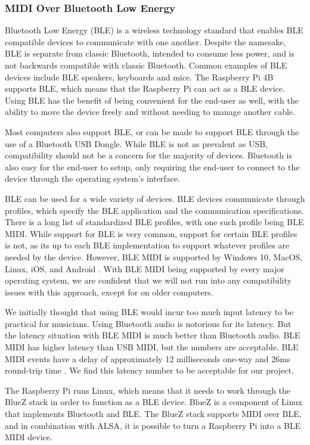 \subsubsection{MIDI Over Bluetooth Low Energy}
\label{sec:ble_midi}

Bluetooth Low Energy (BLE) is a wireless technology standard that enables BLE compatible
devices to communicate with one another. Despite the namesake, BLE is separate from
classic Bluetooth, intended to consume less power, and is not backwards compatible with
classic Bluetooth. Common examples of BLE devices include BLE speakers, keyboards and
mice. The Raspberry Pi 4B supports BLE, which means that the Raspberry Pi can act as a BLE
device. Using BLE has the benefit of being convenient for the end-user as well, with the
ability to move the device freely and without needing to manage another cable.

Most computers also support BLE, or can be made to support BLE through the use of a
Bluetooth USB Dongle. While BLE is not as prevalent as USB, compatibility should not be a
concern for the majority of devices. Bluetooth is also easy for the end-user to setup,
only requiring the end-user to connect to the device through the operating system's
interface.

BLE can be used for a wide variety of devices. BLE devices communicate through profiles,
which specify the BLE  application and the communication specifications. There is a long
list of standardized BLE profiles, with one such profile being BLE MIDI. While support for
BLE is very common, support for certain BLE profiles is not, as its up to each BLE
implementation to support whatever profiles are needed by the device. However, BLE MIDI is
supported by Windows 10, MacOS, Linux, iOS, and Android \autocite{ble-latency}. With BLE
MIDI being supported by every major operating system, we are confident that we will not
run into any compatibility issues with this approach, except for on older computers.

We initially thought that using BLE would incur too much input latency to be practical for
musicians. Using Bluetooth audio is notorious for its latency. But the latency situation
with BLE MIDI is much better than Bluetooth audio. BLE MIDI has higher latency than USB
MIDI, but the numbers are acceptable. BLE MIDI events have a delay of approximately 12
milliseconds one-way and 26ms round-trip time \autocite{ble-latency}. We find this
latency number to be acceptable for our project.

The Raspberry Pi runs Linux, which means that it needs to work through the BlueZ stack in
order to function as a BLE device. BlueZ is a component of Linux that implements Bluetooth
and BLE. The BlueZ stack supports MIDI over BLE, and in combination with ALSA, it is
possible to turn a Raspberry Pi into a BLE MIDI device.

